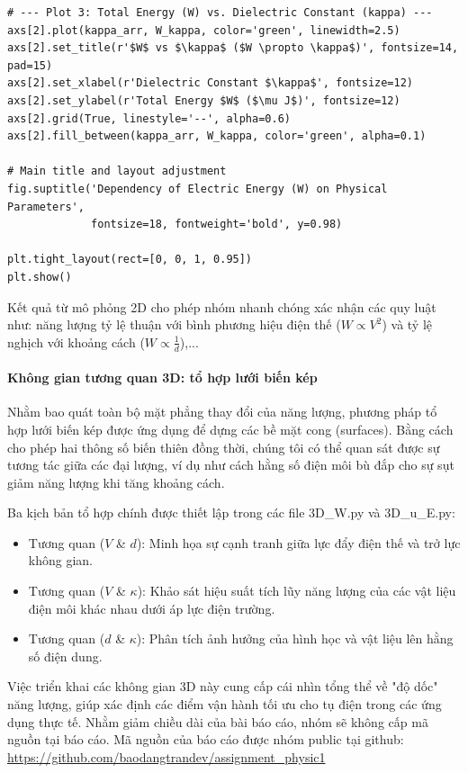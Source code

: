\begin{lstlisting}[style=pythonstyle, caption={Đoạn code 2D tính tổng năng lượng (W)}]
# --- Plot 3: Total Energy (W) vs. Dielectric Constant (kappa) ---
axs[2].plot(kappa_arr, W_kappa, color='green', linewidth=2.5)
axs[2].set_title(r'$W$ vs $\kappa$ ($W \propto \kappa$)', fontsize=14, pad=15)
axs[2].set_xlabel(r'Dielectric Constant $\kappa$', fontsize=12)
axs[2].set_ylabel(r'Total Energy $W$ ($\mu J$)', fontsize=12)
axs[2].grid(True, linestyle='--', alpha=0.6)
axs[2].fill_between(kappa_arr, W_kappa, color='green', alpha=0.1)

# Main title and layout adjustment
fig.suptitle('Dependency of Electric Energy (W) on Physical Parameters', 
             fontsize=18, fontweight='bold', y=0.98)

plt.tight_layout(rect=[0, 0, 1, 0.95])
plt.show()
\end{lstlisting}

Kết quả từ mô phỏng 2D cho phép nhóm nhanh chóng xác nhận các quy luật như: năng lượng tỷ lệ thuận với bình phương hiệu điện thế ($W \propto V^2$) và tỷ lệ nghịch với khoảng cách ($W \propto \frac{1}{d}$),...

\paragraph{Không gian tương quan 3D: tổ hợp lưới biến kép\\}
Nhằm bao quát toàn bộ mặt phẳng thay đổi của năng lượng, phương pháp tổ hợp lưới biến kép được ứng dụng để dựng các bề mặt cong (surfaces). Bằng cách cho phép hai thông số biến thiên đồng thời, chúng tôi có thể quan sát được sự tương tác giữa các đại lượng, ví dụ như cách hằng số điện môi bù đắp cho sự sụt giảm năng lượng khi tăng khoảng cách.

Ba kịch bản tổ hợp chính được thiết lập trong các file 3D\_W.py và 3D\_u\_E.py:
\begin{itemize}
    \item Tương quan ($V$ \& $d$): Minh họa sự cạnh tranh giữa lực đẩy điện thế và trở lực không gian.
    \item Tương quan ($V$ \& $\kappa$): Khảo sát hiệu suất tích lũy năng lượng của các vật liệu điện môi khác nhau dưới áp lực điện trường.
    \item Tương quan ($d$ \& $\kappa$): Phân tích ảnh hưởng của hình học và vật liệu lên hằng số điện dung.
\end{itemize}
Việc triển khai các không gian 3D này cung cấp cái nhìn tổng thể về "độ dốc" năng lượng, giúp xác định các điểm vận hành tối ưu cho tụ điện trong các ứng dụng thực tế. Nhằm giảm chiều dài của bài báo cáo, nhóm sẽ không cấp mã nguồn tại báo cáo. Mã nguồn của báo cáo được nhóm public tại github: \url{https://github.com/baodangtrandev/assignment_physic1}

